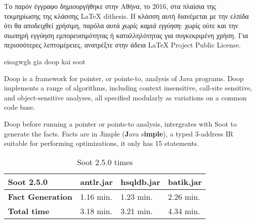 \documentclass{dithesis}
\begin{document}
\tableofcontents
\listoffigures
\listoftables

\begin{thesisprologue}[Πρόλογος]
    Το παρόν έγγραφο δημιουργήθηκε στην Αθήνα, το 2016, στα πλαίσια της 
    τεκμηρίωσης της κλάσσης \LaTeX{} dithesis.
    Η κλάσση αυτή διανέμεται με την ελπίδα ότι θα αποδειχθεί χρήσιμη, παρόλα αυτά 
    \emph{χωρίς καμιά εγγύηση}: χωρίς ούτε και την σιωπηρή εγγύηση 
    εμπορευσιμότητας ή καταλληλότητας για συγκεκριμένη χρήση.
    Για περισσότερες λεπτομέρειες, ανατρέξτε στην άδεια LaTeX Project Public 
    License.
\end{thesisprologue}

    eisagwgh gia doop kai soot

    Doop is a framework for pointer, or points-to, analysis of Java programs. 
    Doop implements a range of algorithms, including context insensitive, call-site sensitive, 
    and object-sensitive analyses, all specified modularly as variations on a common code base.
    
        Doop before running a pointer or points-to analysis, intergrates with Soot to generate
        the facts. Facts are in Jimple (\textbf{J}ava s\textbf{imple}), a typed 3-address IR suitable for performing
        optimizations, it only has 15 statements.

        \begin{table}[H]
        \centering
        \caption{Soot 2.5.0 times}
        \label{my-label}
        \begin{tabular}{llll}
        \hline
        \textbf{Soot 2.5.0}      & \textbf{antlr.jar} & \textbf{hsqldb.jar} & \textbf{batik.jar} \\ \hline
        \textbf{Fact Generation} & 1.16 min.          & 1.23 min.           & 2.26 min.          \\
        \textbf{Total time}      & 3.18 min.          & 3.21 min.           & 4.34 min.          \\ \hline
        \end{tabular}
        \end{table}

\end{document}
